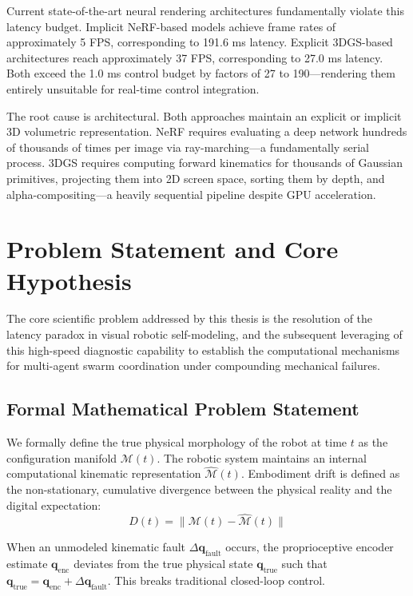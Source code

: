 \documentclass[12pt,a4paper,oneside]{report}
\begin{document}
Current state-of-the-art neural rendering architectures fundamentally violate this latency budget. Implicit NeRF-based models achieve frame rates of approximately 5 FPS, corresponding to 191.6 ms latency. Explicit 3DGS-based architectures reach approximately 37 FPS, corresponding to 27.0 ms latency. Both exceed the 1.0 ms control budget by factors of 27 to 190---rendering them entirely unsuitable for real-time control integration.

The root cause is architectural. Both approaches maintain an explicit or implicit 3D volumetric representation. NeRF requires evaluating a deep network hundreds of thousands of times per image via ray-marching---a fundamentally serial process. 3DGS requires computing forward kinematics for thousands of Gaussian primitives, projecting them into 2D screen space, sorting them by depth, and alpha-compositing---a heavily sequential pipeline despite GPU acceleration.

\section{Problem Statement and Core Hypothesis}
\label{sec:problem_hypothesis_intro}

The core scientific problem addressed by this thesis is the resolution of the latency paradox in visual robotic self-modeling, and the subsequent leveraging of this high-speed diagnostic capability to establish the computational mechanisms for multi-agent swarm coordination under compounding mechanical failures.

\subsection{Formal Mathematical Problem Statement}
\label{subsec:formal_mathematical_problem_statement_intro}

We formally define the true physical morphology of the robot at time $t$ as the configuration manifold $\mathcal{M}(t)$. The robotic system maintains an internal computational kinematic representation $\hat{\mathcal{M}}(t)$. Embodiment drift is defined as the non-stationary, cumulative divergence between the physical reality and the digital expectation:
\begin{equation}
D(t) = \|\mathcal{M}(t) - \hat{\mathcal{M}}(t)\|
\end{equation}

When an unmodeled kinematic fault $\Delta \mathbf{q}_{\text{fault}}$ occurs, the proprioceptive encoder estimate $\mathbf{q}_{\text{enc}}$ deviates from the true physical state $\mathbf{q}_{\text{true}}$ such that $\mathbf{q}_{\text{true}} = \mathbf{q}_{\text{enc}} + \Delta \mathbf{q}_{\text{fault}}$. This breaks traditional closed-loop control. 
\end{document}
